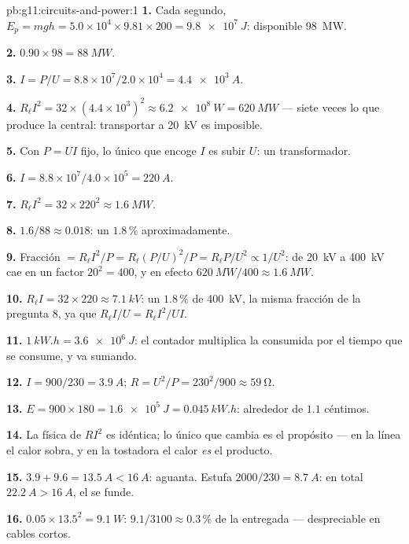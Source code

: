 \begin{solution}{pb:g11:circuits-and-power:1}
\textbf{1.} Cada segundo,
$E_p = mgh = 5.0\times10^{4} \times 9.81 \times 200 = \qty{9.8e7}{J}$:
 disponible \qty{98}{MW}.

\textbf{2.} $0.90 \times 98 = \qty{88}{MW}$.

\textbf{3.} $I = P/U = 8.8\times10^{7}/2.0\times10^{4} = \qty{4.4e3}{A}$.

\textbf{4.} $R_\ell I^2 = 32 \times (4.4\times10^{3})^2 \approx
\qty{6.2e8}{W} = \qty{620}{MW}$ --- siete veces lo que produce la
central: transportar a \qty{20}{kV} es imposible.

\textbf{5.} Con $P = UI$ fijo, lo único que encoge $I$ es subir $U$: un
transformador.

\textbf{6.} $I = 8.8\times10^{7}/4.0\times10^{5} = \qty{220}{A}$.

\textbf{7.} $R_\ell I^2 = 32 \times 220^2 \approx \qty{1.6}{MW}$.

\textbf{8.} $1.6/88 \approx 0.018$: un $1.8\,\%$ aproximadamente.

\textbf{9.} Fracción $= R_\ell I^2/P = R_\ell (P/U)^2/P = R_\ell P/U^2
\propto 1/U^2$: de \qty{20}{kV} a \qty{400}{kV} cae en un factor
$20^2 = 400$, y en efecto
$\qty{620}{MW}/400 \approx \qty{1.6}{MW}$.

\textbf{10.} $R_\ell I = 32 \times 220 \approx \qty{7.1}{kV}$: un
$1.8\,\%$ de \qty{400}{kV}, la misma fracción de la pregunta 8, ya que
$R_\ell I/U = R_\ell I^2/UI$.

\textbf{11.} $\qty{1}{kW.h} = \qty{3.6e6}{J}$: el contador multiplica la
 consumida por el tiempo que se consume, y va sumando.

\textbf{12.} $I = 900/230 = \qty{3.9}{A}$;
$R = U^2/P = 230^2/900 \approx \qty{59}{\ohm}$.

\textbf{13.} $E = 900 \times 180 = \qty{1.6e5}{J} = \qty{0.045}{kW.h}$:
alrededor de $1.1$ céntimos.

\textbf{14.} La física de $RI^2$ es idéntica; lo único que cambia es el
propósito --- en la línea el calor sobra, y en la tostadora el calor
\emph{es} el producto.

\textbf{15.} $3.9 + 9.6 = \qty{13.5}{A} < \qty{16}{A}$: aguanta. Estufa
$2000/230 = \qty{8.7}{A}$: en total $\qty{22.2}{A} > \qty{16}{A}$, el
 se funde.

\textbf{16.} $0.05 \times 13.5^2 = \qty{9.1}{W}$:
$9.1/3100 \approx 0.3\,\%$ de la  entregada --- despreciable en
cables cortos.


\end{solution}
